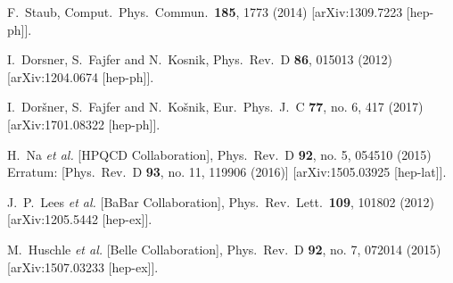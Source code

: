 \documentclass[aps,prd,superscriptaddress,twocolumn,secnumarabic]{revtex4-1}
\begin{document}
\begin{thebibliography}{99}
  F.~Staub,
  Comput.\ Phys.\ Commun.\  {\bf 185}, 1773 (2014)
  [arXiv:1309.7223 [hep-ph]].

  I.~Dorsner, S.~Fajfer and N.~Kosnik,
  Phys.\ Rev.\ D {\bf 86}, 015013 (2012)
  [arXiv:1204.0674 [hep-ph]].

  I.~Doršner, S.~Fajfer and N.~Košnik,
  Eur.\ Phys.\ J.\ C {\bf 77}, no. 6, 417 (2017)
  [arXiv:1701.08322 [hep-ph]].



  H.~Na {\it et al.} [HPQCD Collaboration],
  Phys.\ Rev.\ D {\bf 92}, no. 5, 054510 (2015)
  Erratum: [Phys.\ Rev.\ D {\bf 93}, no. 11, 119906 (2016)]
  [arXiv:1505.03925 [hep-lat]].


  J.~P.~Lees {\it et al.} [BaBar Collaboration],
  Phys.\ Rev.\ Lett.\  {\bf 109}, 101802 (2012)
  [arXiv:1205.5442 [hep-ex]].


  M.~Huschle {\it et al.} [Belle Collaboration],
  Phys.\ Rev.\ D {\bf 92}, no. 7, 072014 (2015)
  [arXiv:1507.03233 [hep-ex]].



\end{thebibliography}
\end{document}
